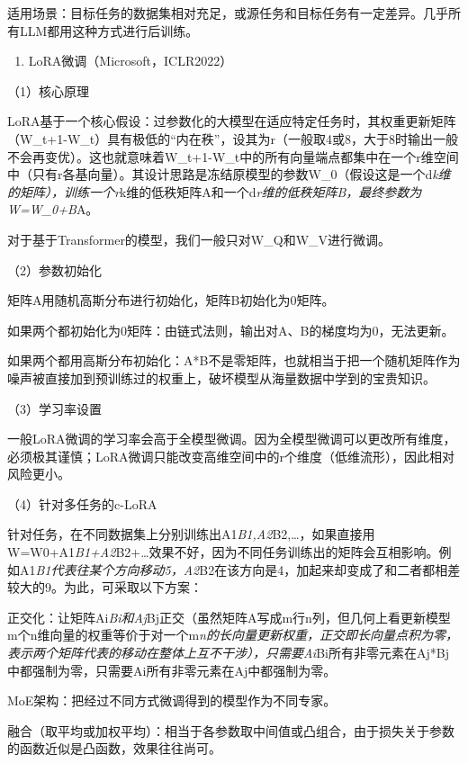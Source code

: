 适用场景：目标任务的数据集相对充足，或源任务和目标任务有一定差异。几乎所有LLM都用这种方式进行后训练。

\begin{enumerate}
\def\labelenumi{\arabic{enumi}.}
\setcounter{enumi}{2}
\tightlist
\item
  LoRA微调（Microsoft，ICLR2022）
\end{enumerate}

（1）核心原理

LoRA基于一个核心假设：过参数化的大模型在适应特定任务时，其权重更新矩阵（W\_t+1-W\_t）具有极低的``内在秩''，设其为r（一般取4或8，大于8时输出一般不会再变优）。这也就意味着W\_t+1-W\_t中的所有向量端点都集中在一个r维空间中（只有r各基向量）。其设计思路是冻结原模型的参数W\_0（假设这是一个d\emph{k维的矩阵），训练一个r}k维的低秩矩阵A和一个d\emph{r维的低秩矩阵B，最终参数为W=W\_0+B}A。

对于基于Transformer的模型，我们一般只对W\_Q和W\_V进行微调。

（2）参数初始化

矩阵A用随机高斯分布进行初始化，矩阵B初始化为0矩阵。

如果两个都初始化为0矩阵：由链式法则，输出对A、B的梯度均为0，无法更新。

如果两个都用高斯分布初始化：A*B不是零矩阵，也就相当于把一个随机矩阵作为噪声被直接加到预训练过的权重上，破坏模型从海量数据中学到的宝贵知识。

（3）学习率设置

一般LoRA微调的学习率会高于全模型微调。因为全模型微调可以更改所有维度，必须极其谨慎；LoRA微调只能改变高维空间中的r个维度（低维流形），因此相对风险更小。

（4）针对多任务的c-LoRA

针对任务，在不同数据集上分别训练出A1\emph{B1,A2}B2,\ldots，如果直接用W=W0+A1\emph{B1+A2}B2+\ldots 效果不好，因为不同任务训练出的矩阵会互相影响。例如A1\emph{B1代表往某个方向移动5，A2}B2在该方向是4，加起来却变成了和二者都相差较大的9。为此，可采取以下方案：

正交化：让矩阵Ai\emph{Bi和Aj}Bj正交（虽然矩阵A写成m行n列，但几何上看更新模型m个n维向量的权重等价于对一个m\emph{n的长向量更新权重，正交即长向量点积为零，表示两个矩阵代表的移动在整体上互不干涉），只需要Ai}Bi所有非零元素在Aj*Bj中都强制为零，只需要Ai所有非零元素在Aj中都强制为零。

MoE架构：把经过不同方式微调得到的模型作为不同专家。

融合（取平均或加权平均）：相当于各参数取中间值或凸组合，由于损失关于参数的函数近似是凸函数，效果往往尚可。

